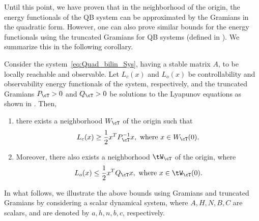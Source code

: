 Until this point, we have proven that in the neighborhood of the origin, the energy functionals of the QB system can be  approximated by the Gramians in the quadratic form. However, one can also prove similar bounds for the energy functionals using the truncated Gramians for QB systems (defined in ). We summarize this in the following corollary.
\begin{corollary}\label{coro:tru_energy}
Consider the system~\eqref{eq:Quad_bilin_Sys}, having a stable matrix $A$, to be locally reachable and observable. Let $L_c(x)$ and $L_o(x)$  be controllability and observability energy functionals of the system, respectively, and the truncated Gramians $P_\cT>0$ and $Q_\cT >0$ be solutions to the Lyapunov equations as shown in .  Then, \
\begin{enumerate}[label=(\roman*)]
	\item there exists a neighborhood $W_\cT$ of the origin such that
	\begin{equation*}
	L_c(x) \geq \frac{1}{2}x^T P_\cT^{-1}x,~\mbox{where}~x\in W_\cT(0).
	\end{equation*}
	\item Moreover,  there also exists a neighborhood $\tW_\cT$ of the origin, where
	\begin{equation*}
	L_o(x) \leq  \frac{1}{2}x^T Q_\cT x,~\mbox{where}~x\in \tW_\cT(0).
	\end{equation*}
\end{enumerate}
  \end{corollary}
In what follows, we illustrate the above bounds using Gramians and truncated Gramians by considering a scalar dynamical system, where $A,H,N,B,C$ are scalars, and are denoted by $a,h,n,b,c$, respectively.
